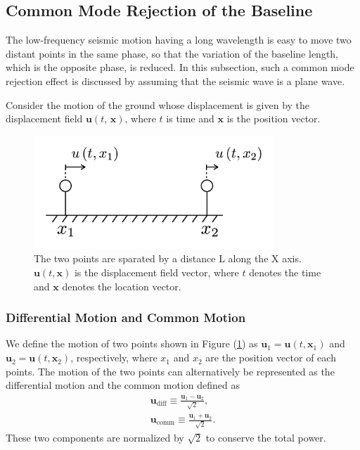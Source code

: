 \subsection{Common Mode Rejection of the Baseline} \label{sec:312}
The low-frequency seismic motion having a long wavelength is easy to move two distant points in the same phase, so that the variation of the baseline length, which is the opposite phase, is reduced. In this subsection, such a common mode rejection effect is discussed by assuming that the seismic wave is a plane wave.

Consider the motion of the ground whose displacement is given by the displacement field $\bm{u}(t,\,\bm{x})$, where $t$ is time and $\bm{x}$ is the position vector.

\begin{figure}[h]
  \begin{center}
    \includegraphics[width=9.0cm]{./img_chap3/img315.png}
    \caption{The two points are sparated by a distance L along the X axis. $\bm{u}(t,\bm{x})$ is the displacement field vector, where $t$ denotes the time and $\bm{x}$ denotes the location vector.}\label{img:img310}    
  \end{center}
\end{figure}

\subsubsection{Differential Motion and Common Motion}
We define the motion of two points shown in Figure (\ref{img:img310}) as $\bm{u}_1=\bm{u}(t,\bm{x}_1)$ and $\bm{u}_2=\bm{u}(t,\bm{x}_2)$, respectively, where $x_1$ and $x_2$ are the position vector of each points. The motion of the two points can alternatively be represented as the differential motion and the common motion defined as
\begin{eqnarray}
  \bm{u}_{\mathrm{diff}} \equiv \frac{\bm{u}_{1}-\bm{u}_{2}}{\sqrt{2}}, \, \\ \label{eq:eq22}
  \bm{u}_{\mathrm{comm}}  \equiv \frac{\bm{u}_{1}+\bm{u}_{2}}{\sqrt{2}}. \label{eq:eq100}
\end{eqnarray}
These two components are normalized by $\sqrt{2}$ to conserve the total power.



